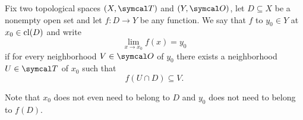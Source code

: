 \begin{definition}\label{def:convergence_of_function_at_point}
  Fix two topological spaces \( (X, \Cal{T}) \) and \( (Y, \Cal{O}) \), let \( D \subseteq X \) be a nonempty open set and let \( f: D \to Y \) be any function. We say that \( f \)  to \( y_0 \in Y \) at \( x_0 \in \operatorname{cl}(D) \) and write
  \begin{equation*}
    \lim_{x \to x_0} f(x) = y_0
  \end{equation*}
  if for every neighborhood \( V \in \Cal{O} \) of \( y_0 \) there exists a neighborhood \( U \in \Cal{T} \) of \( x_0 \) such that
  \begin{equation*}
    f(U \cap D) \subseteq V.
  \end{equation*}

  Note that \( x_0 \) does not even need to belong to \( D \) and \( y_0 \) does not need to belong to \( f(D) \).
\end{definition}
